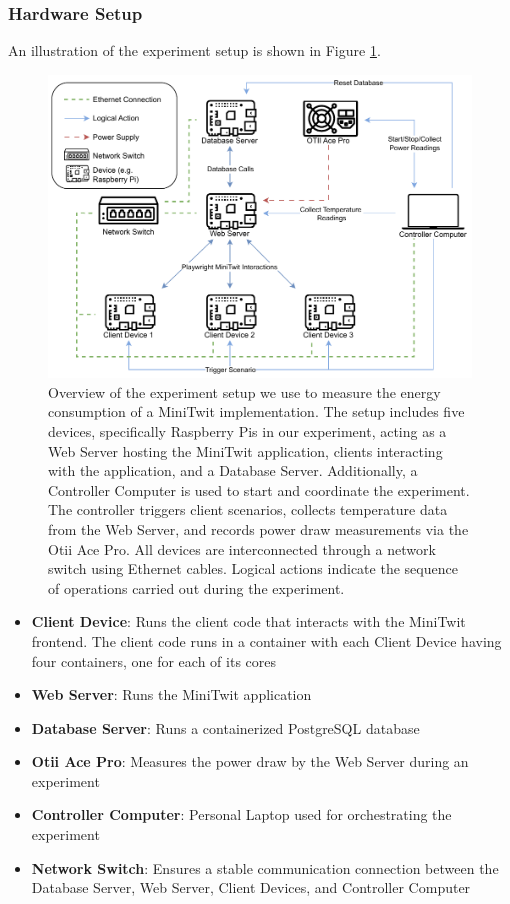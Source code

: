 \documentclass[main.tex]{subfiles}
\begin{document}
\subsubsection{Hardware Setup}
An illustration of the experiment setup is shown in Figure \ref{fig:experiment-setup}.

\begin{figure}[]
    \centering
    \includegraphics[width=0.8\linewidth]{media/experiment/experiment-Setup.pdf}
    \caption{Overview of the experiment setup we use to measure the energy consumption of a MiniTwit implementation. The setup includes five devices, specifically Raspberry Pis in our experiment, acting as a Web Server hosting the MiniTwit application, clients interacting with the application, and a Database Server. Additionally, a Controller Computer is used to start and coordinate the experiment. The controller triggers client scenarios, collects temperature data from the Web Server, and records power draw measurements via the Otii Ace Pro. All devices are interconnected through a network switch using Ethernet cables. Logical actions indicate the sequence of operations carried out during the experiment.}
    \label{fig:experiment-setup}
\end{figure}

\begin{itemize}
    \item \textbf{Client Device}: Runs the client code that interacts with the MiniTwit frontend. The client code runs in a container with each Client Device having four containers, one for each of its cores
    \item \textbf{Web Server}: Runs the MiniTwit application
    \item \textbf{Database Server}: Runs a containerized PostgreSQL database
    \item \textbf{Otii Ace Pro\cite{qoitech_otii_ace_pro}}: Measures the power draw by the Web Server during an experiment
    \item \textbf{Controller Computer}: Personal Laptop used for orchestrating the experiment
    \item \textbf{Network Switch}: Ensures a stable communication connection between the Database Server, Web Server, Client Devices, and Controller Computer
\end{itemize}
\end{document}
